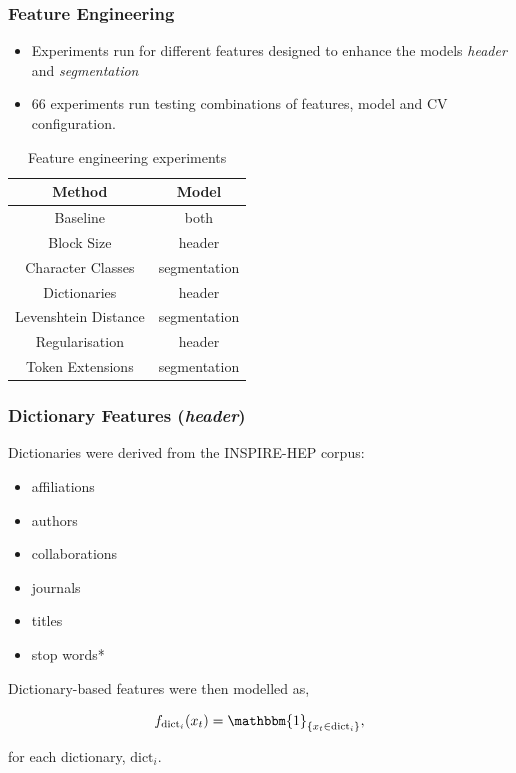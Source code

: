 \documentclass{beamer}
\begin{document}
\begin{frame}
\frametitle{Feature Engineering}

\begin{itemize}
\item Experiments run for different features designed to enhance the models \emph{header} and \emph{segmentation}
\item 66 experiments run testing combinations of features, model and CV configuration.
\end{itemize}

\begin{table}[h]
\begin{center}
\begin{tabular}{|c|c|}
\hline
Method & Model \\
\hline
\hline
Baseline & both \\
\hline
Block Size & {header} \\
\hline
Character Classes & {segmentation} \\
\hline
Dictionaries & {header} \\
\hline
Levenshtein Distance & {segmentation} \\
\hline
Regularisation & {header} \\
\hline
Token Extensions & {segmentation} \\
\hline
\end{tabular}
\caption[]{Feature engineering experiments}
\end{center}
\end{table}
\end{frame}


\begin{frame}
\frametitle{Dictionary Features (\emph{header})}

Dictionaries were derived from the INSPIRE-HEP corpus:

\begin{itemize}
\item affiliations
\item authors
\item collaborations
\item journals
\item titles
\item stop words*
\end{itemize}

Dictionary-based features were then modelled as,

$$
f_{\text{dict}_i}(x_t) = \mathbbm{1}_{\{x_t \in \text{dict}_i\}},
$$

for each dictionary, $\text{dict}_i$.

\end{frame}
\end{document}
